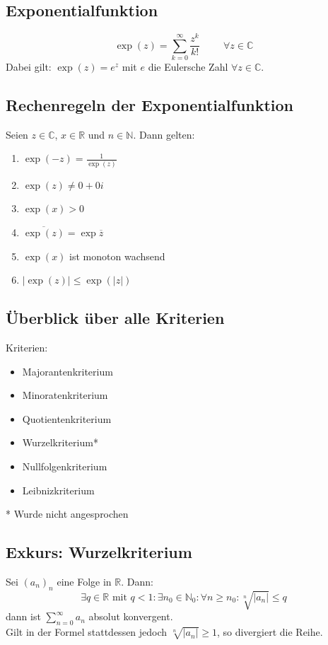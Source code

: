 \documentclass[halfparscip]{scrartcl}
\newcounter{subsection2}
\begin{document}
\subsection{Exponentialfunktion}
\begin{equation*}
	\exp(z) = \sum_{k=0}^\infty\frac{z^k}{k!} \hspace{1cm}\forall z \in \mathbb{C}
\end{equation*}
Dabei gilt: $\exp(z) = e^z$ mit $e$ die Eulersche Zahl $\forall z \in \mathbb{C}$.

\subsection{Rechenregeln der Exponentialfunktion}
Seien $z \in \mathbb{C}$, $x \in \mathbb{R}$ und $n \in \mathbb{N}$. Dann gelten:
\begin{enumerate}
	\item $\exp(-z) = \frac{1}{\exp(z)}$
	\item $\exp(z) \neq 0+0i$
	\item $\exp(x) > 0$
	\item $\overline{\exp(z)} = \exp \overline{z}$
	\item $\exp(x)$ ist monoton wachsend
	\item $\vert \exp(z)\vert \leq \exp (\vert z\vert)$
\end{enumerate}


\subsection*{Überblick über alle Kriterien}
Kriterien:
\begin{itemize}
	\item Majorantenkriterium
	\item Minoratenkriterium
	\item Quotientenkriterium
	\item Wurzelkriterium*
	\item Nullfolgenkriterium
	\item Leibnizkriterium
\end{itemize}
* Wurde nicht angesprochen
\subsection*{Exkurs: Wurzelkriterium}
Sei $(a_n)_n$ eine Folge in $\mathbb{R}$. Dann:
\begin{equation*}
	\exists q \in \mathbb{R} \text{ mit } q < 1 : \exists n_0 \in \mathbb{N}_0 : \forall n \geq n_0 : \sqrt[n]{|a_n|} \leq q
\end{equation*}
dann ist $\sum\limits_{n=0}^\infty a_n$ absolut konvergent.\\
Gilt in der Formel stattdessen jedoch $\sqrt[n]{|a_n|} \geq 1$, so divergiert die Reihe.
\end{document}

